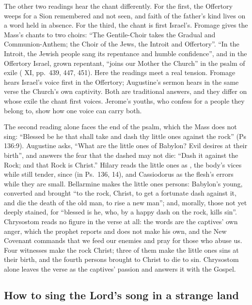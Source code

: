 The other two readings hear the chant differently. For the first, the Offertory
weeps for a Sion remembered and not seen, and faith of the father's kind lives
on a word held in absence. For the third, the chant is first Israel's.
Fromage gives the Mass's chants to two choirs: ``The Gentile-Choir takes the
Gradual and Communion-Anthem; the Choir of the Jews, the Introit and
Offertory''. ``In the Introit, the Jewish people sang its repentance and humble
confidence'', and in the Offertory Israel, grown repentant, ``joins our Mother
the Church'' in the psalm of exile ( XI, pp.~439,
447, 451). Here the readings meet a real tension. Fromage hears Israel's voice
first in the Offertory; Augustine's sermon hears in the same verse the Church's
own captivity. Both are traditional answers, and they differ on whose exile
the chant first voices. Jerome's youths, who confess for a people they belong
to, show how one voice can carry both.

The second reading alone faces the end of the psalm, which the Mass does not
sing: ``Blessed be he that shall take and dash thy little ones against the
rock'' (Ps 136:9). Augustine asks, ``What are the little ones of Babylon? Evil
desires at their birth'', and answers the fear that the dashed may not die:
``Dash it against the Rock; and that Rock is Christ.'' Hilary reads the little
ones as , the body's vices while still
tender, since 
(in Ps.~136, 14), and Cassiodorus as the flesh's errors while they are small.
Bellarmine makes the little ones persons: Babylon's young, converted and
brought ``to the rock, Christ, to get a fortunate dash against it, and die the
death of the old man, to rise a new man''; and, morally, those not yet deeply
stained, for ``blessed is he, who, by a happy dash on the rock, kills sin''.
Chrysostom reads no figure in the verse at all: the words are the captives' own
anger, which the prophet reports and does not make his own, and the New
Covenant commands that we feed our enemies and pray for those who abuse us.
Four witnesses make the rock Christ; three of them make the little ones sins
at their birth, and the fourth persons brought to Christ to die to sin.
Chrysostom alone leaves the verse as the captives' passion and answers it with
the Gospel.

\subsection{How to sing the Lord's song in a strange land}

